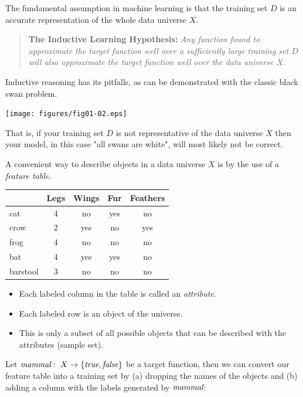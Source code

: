 \documentclass[a4paper,blends,pdf,colorBG,slideColor]{prosper}
\begin{document}
The fundamental assumption in machine learning is that the training  set $D$
is an accurate representation of the whole data universe $X$.

\begin{quote}
{\bf The Inductive Learning Hypothesis:} \it Any function found to approximate the 
target function well over a sufficiently large training set $D$ will 
also approximate the target function well over the data universe $X$.
\end{quote}

\es

Inductive reasoning has its pitfalls, as can be demonstrated with the classic black
swan problem.
\begin{center}
    \texttt{[image: figures/fig01-02.eps]}
\end{center}
That is, if your training set $D$ is not representative of the data universe $X$ then
your model, in this case "all swans are white", will most likely not be correct.
\es

A convenient way to describe objects in a data universe $X$ is by the use of a {\em feature table}.

\begin{center}
{\small
   \begin{tabular}{ l cccc}
      \toprule
         & Legs & Wings & Fur & Feathers\\
      \midrule
      cat      & 4 & no & yes & no \\
      crow      & 2 & yes & no & yes \\
      frog      & 4 & no & no & no \\
      bat      & 4 & yes & yes & no \\
     barstool      & 3 & no & no & no \\
      \bottomrule
   \end{tabular}
   }
\end{center}

\begin{itemize}
\item Each labeled column in the table is called an {\em attribute}.
\item Each labeled row is an object of the universe.
\item This is only a subset of all possible objects that can be described with the attributes (sample set).
\end{itemize}
\es

Let $\text{\it mammal}\,\colon\; X \rightarrow \{\text{\it true}, \text{\it false}\}$ be a target function, then
we can convert our feature table into a training set by (a) dropping the names of the objects and (b) adding a column with the labels generated by $\text{\it mammal}$:
\end{document}
